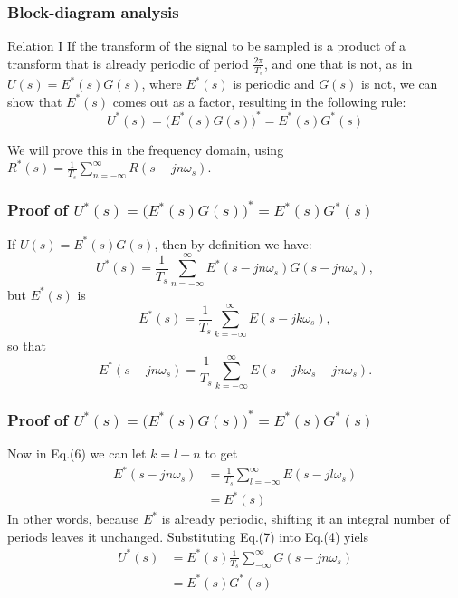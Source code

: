 \begin{frame}
	\frametitle{Block-diagram analysis}
	\begin{block}{Relation I}
		\justify
		If the transform of the signal to be sampled is a product of a transform that is already periodic of period $\frac{2\pi}{T_s}$, and one that is not, as in $U(s) = E^{*}(s)G(s)$, where $E^{*}(s)$ is periodic and $G(s)$ is not, we can show that $E^{*}(s)$ comes out as a factor, resulting in the following rule: 
		\begin{equation}
		U^{*}(s) = \big(E^{*}(s)G(s)\big)^{*} = E^{*}(s)G^{*}(s)
		\end{equation}
	\end{block}
	\vspace{1em}
	We will prove this in the frequency domain, using $R^*(s)=\frac{1}{T_s}\sum_{n=-\infty}^{\infty}R(s-jn\omega_s)$.\\
\end{frame}

\begin{frame}
	\frametitle{Proof of $U^{*}(s) = \big(E^{*}(s)G(s)\big)^{*} = E^{*}(s)G^{*}(s)$}
	If $U(s) = E^{*}(s)G(s)$, then by definition we have:
	\begin{equation}
	U^{*}(s) = \frac{1}{T_s} \sum_{n=-\infty}^{\infty} E^{*}(s - jn\omega_s)G(s - jn\omega_s),
	\end{equation}
	but $E^{*}(s)$ is
	\begin{equation}
	E^{*}(s) = \frac{1}{T_s} \sum_{k=-\infty}^{\infty} E(s-jk\omega_s),
	\end{equation}
	so that
	\begin{equation}
	E^{*}(s-jn\omega_s) = \frac{1}{T_s} \sum_{k=-\infty}^{\infty} E(s - jk\omega_s - jn\omega_s).
	\end{equation}
\end{frame}

\begin{frame}
	\frametitle{Proof of $U^{*}(s) = \big(E^{*}(s)G(s)\big)^{*} = E^{*}(s)G^{*}(s)$}
	Now in Eq.(6) we can let $k = l - n$ to get
	\begin{equation}
	\begin{split}
	E^{*}(s-jn\omega_s) &= \frac{1}{T_s} \sum_{l=-\infty}^{\infty} E(s - jl\omega_s)\\
	&= E^{*}(s)
	\end{split}
	\end{equation}
	\justify
	In other words, because $E^{*}$ is already periodic, shifting it an integral number of periods leaves it unchanged. Substituting Eq.(7) into Eq.(4) yiels
	\begin{equation}
	\begin{split}
	U^{*}(s) &= E^{*}(s) \frac{1}{T_s} \sum_{-\infty}^{\infty} G(s - jn\omega_s)\\
	&= E^{*}(s)G^{*}(s)
	\end{split}
	\end{equation}
\end{frame}

